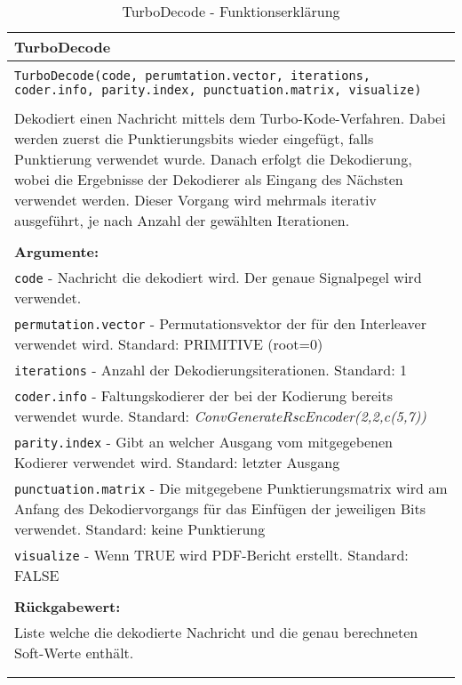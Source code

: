 \begin{longtable}{|p{\textwidth}|}
\hline
\rowcolor{lightblue}TurboDecode\\
\hline
\\
\texttt{TurboDecode(code, perumtation.vector, iterations, coder.info, parity.index, punctuation.matrix, visualize)}\\
\\
Dekodiert einen Nachricht mittels dem Turbo-Kode-Verfahren. Dabei werden zuerst die Punktierungsbits wieder eingefügt, falls Punktierung verwendet wurde. Danach erfolgt die Dekodierung, wobei die Ergebnisse der Dekodierer als Eingang des Nächsten verwendet werden. Dieser Vorgang wird mehrmals iterativ ausgeführt, je nach Anzahl der gewählten Iterationen.\\
\\
\textbf{Argumente:}\\
\texttt{code} - Nachricht die dekodiert wird. Der genaue Signalpegel wird verwendet.\\
\texttt{permutation.vector} - Permutationsvektor der für den Interleaver verwendet wird. Standard: PRIMITIVE (root=0)\\
\texttt{iterations} - Anzahl der Dekodierungsiterationen. Standard: 1\\
\texttt{coder.info} - Faltungskodierer der bei der Kodierung bereits verwendet wurde. Standard: \emph{ConvGenerateRscEncoder(2,2,c(5,7))}\\
\texttt{parity.index} - Gibt an welcher Ausgang vom mitgegebenen Kodierer verwendet wird. Standard: letzter Ausgang\\
\texttt{punctuation.matrix} - Die mitgegebene Punktierungsmatrix wird am Anfang des Dekodiervorgangs für das Einfügen der jeweiligen Bits verwendet. Standard: keine Punktierung\\
\texttt{visualize} - Wenn TRUE wird PDF-Bericht erstellt. Standard: FALSE\\
\\
\textbf{Rückgabewert:}\\
Liste welche die dekodierte Nachricht und die genau berechneten Soft-Werte enthält.\\
\\
\hline
\caption{TurboDecode - Funktionserklärung}
\end{longtable}
